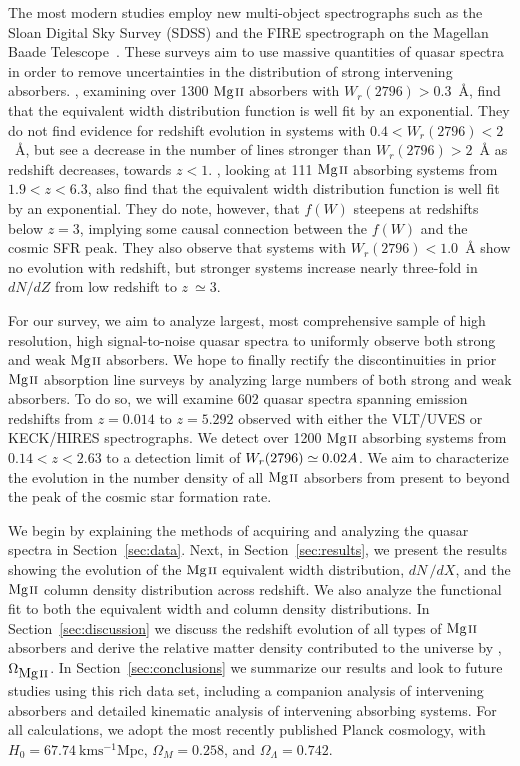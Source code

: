 \documentclass[iop,apj,numberedappendix,appendixfloats,twocolappendix]{emulateapj}
\begin{document}
The most modern studies employ new multi-object spectrographs such as the Sloan Digital Sky Survey (SDSS) and the FIRE spectrograph on the Magellan Baade Telescope~\citep{Nestor2005,Matejek2012}. These surveys aim to use massive quantities of quasar spectra in order to remove uncertainties in the distribution of strong intervening absorbers. \cite{Nestor2005}, examining over 1300 ${\hbox{{\rm Mg}\kern 0.1em{\sc ii}}}$ absorbers with $W_r(2796) > 0.3$~{\AA}, find that the equivalent width distribution function is well fit by an exponential. They do not find evidence for redshift evolution in systems with $0.4 < W_r(2796) < 2$~{\AA}, but see a decrease in the number of lines stronger than $W_r(2796) > 2$~{\AA} as redshift decreases, towards $z < 1$. \cite{Matejek2012}, looking at 111 ${\hbox{{\rm Mg}\kern 0.1em{\sc ii}}}$ absorbing systems from $1.9 < z < 6.3$, also find that the equivalent width distribution function is well fit by an exponential. They do note, however, that $f(W)$ steepens at redshifts below $z = 3$, implying some causal connection between the $f(W)$ and the cosmic SFR peak. They also observe that systems with $W_r(2796) < 1.0$~{\AA} show no evolution with redshift, but stronger systems increase nearly three-fold in $dN\!/dZ$ from low redshift to $z~\simeq 3$. 

For our survey, we aim to analyze largest, most comprehensive sample of high resolution, high signal-to-noise quasar spectra to uniformly observe both strong and weak ${\hbox{{\rm Mg}\kern 0.1em{\sc ii}}}$ absorbers. We hope to finally rectify the discontinuities in prior ${\hbox{{\rm Mg}\kern 0.1em{\sc ii}}}$ absorption line surveys by analyzing large numbers of both strong and weak absorbers. To do so, we will examine 602 quasar spectra spanning emission redshifts from $z = 0.014$ to $z = 5.292$ observed with either the VLT/UVES or KECK/HIRES spectrographs. We detect over 1200 ${\hbox{{\rm Mg}\kern 0.1em{\sc ii}}}$ absorbing systems from $0.14 < z < 2.63$ to a detection limit of $W_r(2796) \simeq 0.02 {\AA}$. We aim to characterize the evolution in the number density of all ${\hbox{{\rm Mg}\kern 0.1em{\sc ii}}}$ absorbers from present to beyond the peak of the cosmic star formation rate.

We begin by explaining the methods of acquiring and analyzing the quasar spectra in Section~\ref{sec:data}. Next, in Section~\ref{sec:results}, we present the results showing the evolution of the ${\hbox{{\rm Mg}\kern 0.1em{\sc ii}}}$ equivalent width distribution, $dN\,/dX$, and the ${\hbox{{\rm Mg}\kern 0.1em{\sc ii}}}$ column density distribution across redshift. We also analyze the functional fit to both the equivalent width and column density distributions. In Section~\ref{sec:discussion} we discuss the redshift evolution of all types of ${\hbox{{\rm Mg}\kern 0.1em{\sc ii}}}$ absorbers and derive the relative matter density contributed to the universe by {\MgII}, $\Omega_{\hbox{{\rm Mg}\kern 0.1em{\sc ii}}}$. In Section~\ref{sec:conclusions} we summarize our results and look to future studies using this rich data set, including a companion analysis of intervening {\CIV} absorbers and detailed kinematic analysis of intervening absorbing systems. For all calculations, we adopt the most recently published Planck cosmology, with $H_0 = 67.74~\mathrm{km s^{-1} Mpc}$, $\Omega_M = 0.258$, and $\Omega_{\Lambda} = 0.742$.
\end{document}
